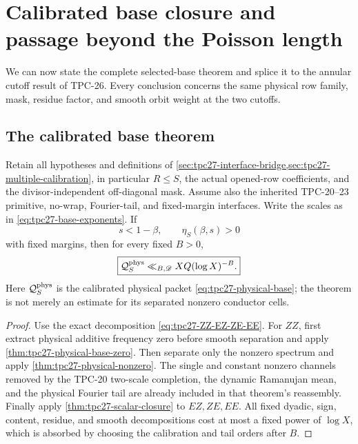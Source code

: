 \section{Calibrated base closure and passage beyond the Poisson length}
\label{sec:tpc27-passage-theorem}

We can now state the complete selected-base theorem and splice it to the
annular cutoff result of TPC-26.  Every conclusion concerns the same
physical row family, mask, residue factor, and smooth orbit weight at
the two cutoffs.

\subsection{The calibrated base theorem}

\begin{theorem}
\label{thm:tpc27-calibrated-base}
Retain all hypotheses and definitions of
\cref{sec:tpc27-interface-bridge,sec:tpc27-multiple-calibration}, in
particular \(R\le S\), the actual opened-row coefficients, and the
divisor-independent off-diagonal mask.  Assume also the inherited
TPC-20--23 primitive, no-wrap, Fourier-tail, and fixed-margin
interfaces.  Write the scales as in \eqref{eq:tpc27-base-exponents}.
If
\begin{equation}
 s<1-\beta,
 \qquad
 \eta_S(\beta,s)>0
 \label{eq:tpc27-base-hypotheses}
\end{equation}
with fixed margins, then for every fixed \(B>0\),
\begin{equation}
 \boxed{
 \mathcal Q_S^{\rm phys}
 \ll_{B,\mathscr D}XQ(\log X)^{-B}.}
 \label{eq:tpc27-calibrated-base}
\end{equation}
Here \(\mathcal Q_S^{\rm phys}\) is the calibrated physical packet
\eqref{eq:tpc27-physical-base}; the theorem is not merely an estimate
for its separated nonzero conductor cells.
\end{theorem}

\begin{proof}
Use the exact decomposition
\eqref{eq:tpc27-ZZ-EZ-ZE-EE}.  For \(ZZ\), first extract physical
additive frequency zero before smooth separation and apply
\cref{thm:tpc27-physical-base-zero}.  Then separate only the nonzero
spectrum and apply \cref{thm:tpc27-physical-nonzero}.  The single and
constant nonzero channels removed by the TPC-20 two-scale completion,
the dynamic Ramanujan mean, and the physical Fourier tail are already
included in that theorem's reassembly.  Finally apply
\cref{thm:tpc27-scalar-closure} to \(EZ,ZE,EE\).  All fixed dyadic,
sign, content, residue, and smooth decompositions cost at most a fixed
power of \(\log X\), which is absorbed by choosing the calibration and
tail orders after \(B\).
\end{proof}

